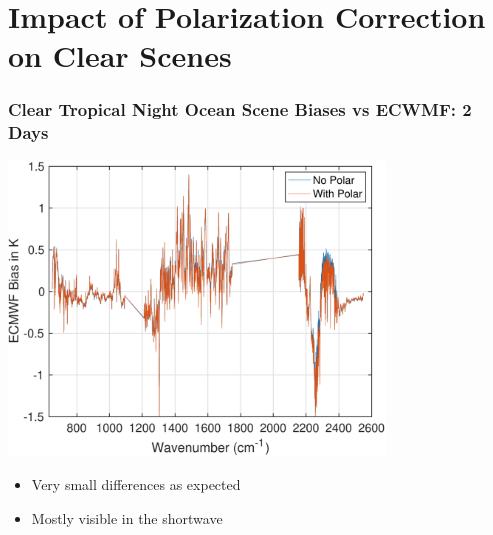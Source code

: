 \documentclass[10pt,t]{beamer} \usepackage[utf8]{inputenc}
\begin{document}
\section{Impact of Polarization Correction on Clear Scenes}
\begin{frame}
  \frametitle{Clear Tropical Night Ocean Scene Biases vs ECWMF: 2 Days}
  \vspace{-0.125in} %
  \begin{center}
    \noindent\includegraphics[width=0.75\textwidth]{Figs/bias_in_k_plon_ploff_with_minorg_corrs.pdf}
  \end{center}
  \begin{itemize}
    \item Very small differences as expected
    \item Mostly visible in the shortwave
      \end{itemize}
\end{frame}
%
\end{document}
